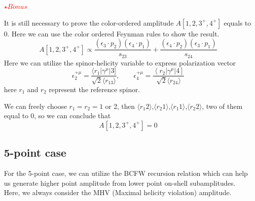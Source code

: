 \documentclass[12pt]{article}
\newcommand{\avg}[1]{\langle #1 \rangle}
\begin{document}
\textcolor{red}{$\star Bonus$}

It is still necessary to prove the color-ordered amplitude $A[1,2,3^+,4^+]$ equals to 0. Here we can use the color ordered Feynman rules to show the result.
\begin{equation*}
    A[1,2,3^+,4^+]\propto \frac{\left(\epsilon_3\cdot p_2\right)\left(\epsilon_4\cdot p_1\right)}{s_{23}}+\frac{\left(\epsilon_4\cdot p_2\right)\left(\epsilon_3\cdot p_1\right)}{s_{24}} 
\end{equation*}
Here we can utilize the spinor-helicity variable to express polarization vector
\begin{equation*}
    \epsilon_2^{+\mu}=\frac{\langle r_1 | \gamma^\mu | 3 ]}{\sqrt{2}\avg{r_13}},\qquad \epsilon_4^{+\mu}=\frac{\left <r_2|\gamma^\mu|4\right ]}{\sqrt{2}\avg{r_24}}
\end{equation*}
here $r_1$ and $r_2$ represent the reference spinor.

We can freely choose $r_1=r_2=1$ or 2, then $\avg{r_1 2}$,$\avg{r_2 1}$,$\avg{r_1 1}$,$\avg{r_2 2}$, two of them equal to 0, so we can conclude that
\begin{equation*}
    A[1,2,3^+,4^+]=0
\end{equation*}
\subsection{5-point case}
For the 5-point case, we can utilize the BCFW recursion relation which can help us generate higher point amplitude from lower point on-shell subamplitudes. Here, 
we always consider the MHV (Maximal helicity violation) amplitude. 
\end{document}
